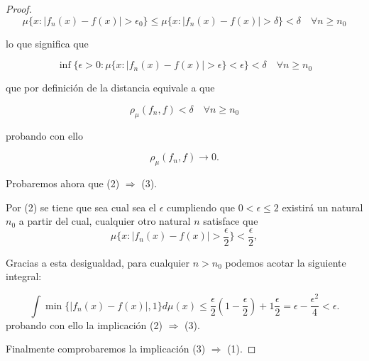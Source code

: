\begin{proof}
    \begin{equation}
        \mu \{ x : |f_n(x) - f(x)| > \epsilon_0 \}
        \leq
        \mu \{ x : |f_n(x) - f(x)| > \delta\}
        < \delta 
        \quad 
        \forall n \geq n_0
    \end{equation}

    lo que significa que 
    
    \begin{equation}
        \inf \{ \epsilon > 0:
         \mu \{ 
             x : |f_n(x) - f(x)| > \epsilon \} < \epsilon 
             \} 
        < \delta 
        \quad 
        \forall n \geq n_0
    \end{equation}

    que por definición de la distancia equivale a que 

    \begin{equation}
        \rho_{\mu}(f_n, f) < \delta \quad \forall n \geq n_0
    \end{equation}

    probando con ello 

    \begin{equation}
        \rho_{\mu}(f_n, f) \longrightarrow 0. 
    \end{equation}

    Probaremos ahora que (2) $\Longrightarrow$ (3).   

    Por (2) se tiene que sea cual sea el $\epsilon$ cumpliendo que 
    $0 < \epsilon \leq 2$ 
    existirá un natural $n_0$ a partir del cual, cualquier otro natural $n$ 
    satisface que 
    \begin{equation} 
        \mu \{  
            x : |f_n(x) - f(x)| > \frac{\epsilon}{2}  
            \}  
        < 
        \frac{\epsilon}{2},  
    \end{equation}

    Gracias a esta desigualdad, para cualquier $n > n_0$ podemos acotar la siguiente integral: 

    \begin{equation}
        \int \min \{ |f_n(x) - f(x)|, 1\} d\mu(x) 
        \leq
        \frac{\epsilon}{2} (1-\frac{\epsilon}{2}) + 1\frac{\epsilon}{2} 
         = \epsilon - \frac{\epsilon^2}{4} <  \epsilon.  
    \end{equation}
    probando con ello la implicación (2) $\Longrightarrow$ (3).

    Finalmente comprobaremos la implicación (3) $\Longrightarrow$ (1).


\end{proof}
